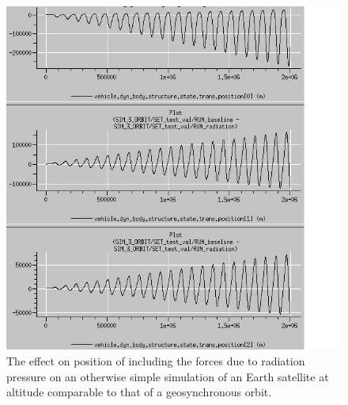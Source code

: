 \begin{description}
  \begin{figure}[!ht]
     \begin{center}
     \includegraphics[width=160mm]{figs/orbital/orbit_delp.jpg}
     \caption{The effect on position of including the forces due to radiation pressure
     on an otherwise simple simulation of an Earth satellite
     at altitude comparable to that of a geosynchronous orbit.}
     \label{fig:ivv_orbit_delp}
     \end{center}
     \end{figure}


\end{description}
